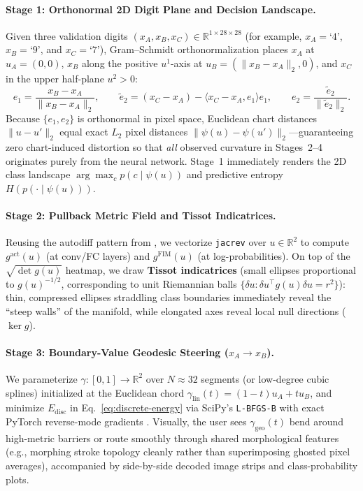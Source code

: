 \documentclass[11pt,a4paper]{article}
\newcommand{\R}{\mathbb{R}}
\theoremstyle{definition}
\begin{document}
\paragraph{Stage 1: Orthonormal 2D Digit Plane and Decision Landscape.}
Given three validation digits $(x_A, x_B, x_C) \in \R^{1 \times 28 \times 28}$ (for example, $x_A = \text{`4'}$, $x_B = \text{`9'}$, and $x_C = \text{`7'}$), Gram--Schmidt orthonormalization places $x_A$ at $u_A = (0, 0)$, $x_B$ along the positive $u^1$-axis at $u_B = (\|x_B - x_A\|_2, 0)$, and $x_C$ in the upper half-plane $u^2 > 0$:
\[
    e_1 = \frac{x_B - x_A}{\|x_B - x_A\|_2}, \qquad
    \tilde{e}_2 = (x_C - x_A) - \langle x_C - x_A, e_1 \rangle e_1, \qquad
    e_2 = \frac{\tilde{e}_2}{\|\tilde{e}_2\|_2}.
\]
Because $\{e_1, e_2\}$ is orthonormal in pixel space, Euclidean chart distances $\|u - u'\|_2$ equal exact $L_2$ pixel distances $\|\psi(u) - \psi(u')\|_2$---guaranteeing zero chart-induced distortion so that \emph{all} observed curvature in Stages~2--4 originates purely from the neural network. Stage~1 immediately renders the 2D class landscape $\arg\max_c p(c \mid \psi(u))$ and predictive entropy $H(p(\cdot \mid \psi(u)))$.

\paragraph{Stage 2: Pullback Metric Field and Tissot Indicatrices.}
Reusing the autodiff pattern from , we vectorize \texttt{jacrev} over $u \in \R^2$ to compute $g^{\mathrm{act}}(u)$ (at conv/FC layers) and $g^{\mathrm{FIM}}(u)$ (at log-probabilities). On top of the $\sqrt{\det g(u)}$ heatmap, we draw \textbf{Tissot indicatrices} (small ellipses proportional to $g(u)^{-1/2}$, corresponding to unit Riemannian balls $\{ \delta u : \delta u^\top g(u) \delta u = r^2 \}$): thin, compressed ellipses straddling class boundaries immediately reveal the ``steep walls'' of the manifold, while elongated axes reveal local null directions ($\ker g$).

\paragraph{Stage 3: Boundary-Value Geodesic Steering ($x_A \to x_B$).}
We parameterize $\gamma : [0,1] \to \R^2$ over $N \approx 32$ segments (or low-degree cubic splines) initialized at the Euclidean chord $\gamma_{\mathrm{lin}}(t) = (1-t)u_A + t u_B$, and minimize $E_{\mathrm{disc}}$ in Eq.~\eqref{eq:discrete-energy} via SciPy's \texttt{L-BFGS-B} with exact PyTorch reverse-mode gradients . Visually, the user sees $\gamma_{\mathrm{geo}}(t)$ bend around high-metric barriers or route smoothly through shared morphological features (e.g., morphing stroke topology cleanly rather than superimposing ghosted pixel averages), accompanied by side-by-side decoded image strips and class-probability plots.
\end{document}
